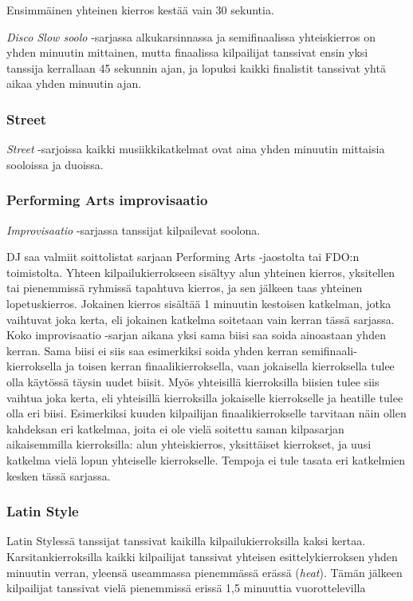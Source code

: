 \documentclass[12pt, a4paper, oneside]{article}
\begin{document}
Ensimmäinen yhteinen kierros kestää vain 30 sekuntia.

\textit{Disco Slow soolo} -sarjassa alkukarsinnassa ja semifinaalissa yhteiskierros on yhden minuutin mittainen,
mutta finaalissa kilpailijat tanssivat ensin yksi tanssija kerrallaan 45 sekunnin ajan,
ja lopuksi kaikki finalistit tanssivat yhtä aikaa yhden minuutin ajan.

\subsubsection{Street}

\textit{Street} -sarjoissa kaikki musiikkikatkelmat ovat aina yhden minuutin mittaisia sooloissa ja duoissa.

\subsubsection{Performing Arts improvisaatio}

\textit{Improvisaatio} -sarjassa tanssijat kilpailevat soolona.

DJ saa valmiit soittolistat sarjaan Performing Arts -jaostolta tai FDO:n toimistolta.
Yhteen kilpailukierrokseen sisältyy alun yhteinen kierros,
yksitellen tai pienemmissä ryhmissä tapahtuva kierros,
ja sen jälkeen taas yhteinen lopetuskierros.
Jokainen kierros sisältää 1 minuutin kestoisen katkelman,
jotka vaihtuvat joka kerta,
eli jokainen katkelma soitetaan vain kerran tässä sarjassa.
Koko improvisaatio -sarjan aikana yksi sama biisi saa soida ainoastaan yhden kerran.
Sama biisi ei siis saa esimerkiksi soida yhden kerran semifinaali-kierroksella ja toisen kerran finaalikierroksella,
vaan jokaisella kierroksella tulee olla käytössä täysin uudet biisit.
Myös yhteisillä kierroksilla biisien tulee siis vaihtua joka kerta,
eli yhteisillä kierroksilla jokaiselle kierrokselle ja heatille tulee olla eri biisi.
Esimerkiksi kuuden kilpailijan finaalikierrokselle tarvitaan näin ollen kahdeksan eri katkelmaa,
joita ei ole vielä soitettu saman kilpasarjan aikaisemmilla kierroksilla:
alun yhteiskierros,
yksittäiset kierrokset,
ja uusi katkelma vielä lopun yhteiselle kierrokselle.
Tempoja ei tule tasata eri katkelmien kesken tässä sarjassa.

\subsubsection{Latin Style}

Latin Stylessä tanssijat tanssivat kaikilla kilpailukierroksilla kaksi kertaa.
Karsitankierroksilla kaikki kilpailijat tanssivat yhteisen esittelykierroksen yhden minuutin verran,
yleensä useammassa pienemmässä erässä (\textit{heat}).
Tämän jälkeen kilpailijat tanssivat vielä pienemmissä erissä 1,5 minuuttia vuorottelevilla
\end{document}
